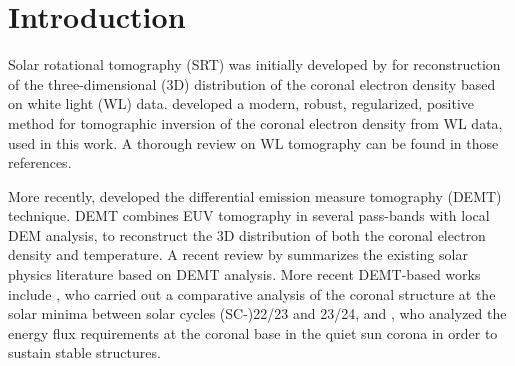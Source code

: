 \documentclass[baaa]{baaa}
\begin{document}


\maketitle

\section{Introduction}\label{intro}

Solar rotational tomography (SRT) was initially developed by \citet{altschuler_1972} for reconstruction of the three-dimensional (3D) distribution of the coronal electron density based on white light (WL) data. \citet{frazin_2002} developed a modern, robust, regularized, positive method for tomographic inversion of the coronal electron density from WL data, used in this work. A thorough review on WL tomography can be found in those references.

More recently, \citet{frazin_2009} developed the differential emission measure tomography (DEMT) technique. DEMT combines EUV tomography in several pass-bands with local DEM analysis, to reconstruct the 3D distribution of both the coronal electron density and temperature. A recent review by \citet{vasquez_2016} summarizes the existing solar physics literature based on DEMT analysis. More recent DEMT-based works include \citet{lloveras_2017}, who carried out a comparative analysis of the coronal structure at the solar minima between solar cycles (SC-)22/23 and 23/24, and \citet{maccormack_2017}, who analyzed the energy flux requirements at the coronal base in the quiet sun corona in order to sustain stable structures. 
\end{document}
